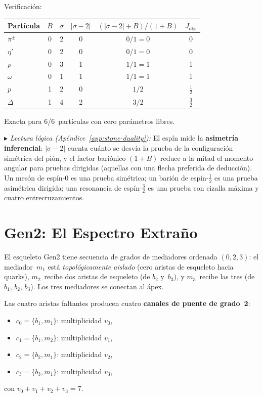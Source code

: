 \documentclass[11pt, a4paper, openany]{book}
\newcommand{\stoneref}[1]{%
  \smallskip\noindent
  {\small\color{structure!70}\textit{$\blacktriangleright$ Lectura
  l\'ogica (Ap\'endice~\ref{app:stone-duality}):} #1}%
  \smallskip}
\begin{document}
\noindent Verificaci\'on:
\medskip
\begin{center}
\renewcommand{\arraystretch}{1.3}
\begin{tabular}{lccccc}
\toprule
Part\'icula & $B$ & $\sigma$ & $|\sigma - 2|$
  & $(|\sigma{-}2| + B)/(1{+}B)$ & $J_{\mathrm{obs}}$ \\
\midrule
$\pi^{\pm}$ & 0 & 2 & 0 & $0/1 = 0$ & 0 \\
$\eta'$      & 0 & 2 & 0 & $0/1 = 0$ & 0 \\
$\rho$       & 0 & 3 & 1 & $1/1 = 1$ & 1 \\
$\omega$     & 0 & 1 & 1 & $1/1 = 1$ & 1 \\
$p$          & 1 & 2 & 0 & $1/2$ & $\tfrac{1}{2}$ \\
$\Delta$     & 1 & 4 & 2 & $3/2$ & $\tfrac{3}{2}$ \\
\bottomrule
\end{tabular}
\end{center}

\medskip
\noindent Exacta para 6/6~part\'iculas con cero par\'ametros libres.

\stoneref{El esp\'in mide la \textbf{asimetr\'ia inferencial}:
$|\sigma - 2|$ cuenta cu\'anto se desv\'ia la prueba de la
configuraci\'on sim\'etrica del pi\'on, y el factor bari\'onico
$(1 + B)$ reduce a la mitad el momento angular para pruebas
dirigidas (aquellas con una flecha preferida de deducci\'on).
Un mes\'on de esp\'in-0 es una prueba sim\'etrica; un bari\'on de
esp\'in-$\frac{1}{2}$ es una prueba asim\'etrica dirigida; una
resonancia de esp\'in-$\frac{3}{2}$ es una prueba con cizalla
m\'axima y cuatro entrecruzamientos.}

\section{Gen2: El Espectro Extra\~no}
\label{sec:gen2-spectrum}

El esqueleto Gen2 tiene secuencia de grados de mediadores ordenada
$(0, 2, 3)$: el mediador~$m_1$ est\'a \emph{topol\'ogicamente
aislado} (cero aristas de esqueleto hacia quarks), $m_2$~recibe dos
aristas de esqueleto (de $b_2$ y~$b_3$), y $m_3$~recibe las tres
(de $b_1$, $b_2$, $b_3$).  Los tres mediadores se conectan al
\'apex.

Las cuatro aristas faltantes producen cuatro \textbf{canales de
puente de grado~2}:
\begin{itemize}
  \item $c_0 = \{b_1, m_1\}$: multiplicidad $v_0$,
  \item $c_1 = \{b_1, m_2\}$: multiplicidad $v_1$,
  \item $c_2 = \{b_2, m_1\}$: multiplicidad $v_2$,
  \item $c_3 = \{b_3, m_1\}$: multiplicidad $v_3$,
\end{itemize}
con $v_0 + v_1 + v_2 + v_3 = 7$.
\end{document}

